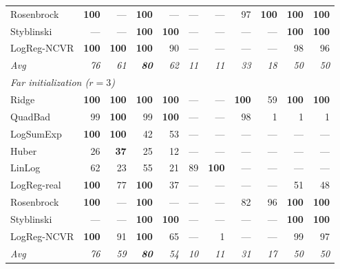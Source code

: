 \documentclass[11pt,a4paper]{article}
\begin{document}
\begin{table}[t]
\begin{tabular}{l rrrr rr rrrr}
			Rosenbrock  & \textbf{100} & --- & \textbf{100} & --- & --- & --- & 97  & \textbf{100} & \textbf{100} & \textbf{100} \\
			Styblinski  & --- & --- & \textbf{100} & \textbf{100} & --- & --- & --- & --- & \textbf{100} & \textbf{100} \\
			LogReg-NCVR & \textbf{100} & \textbf{100} & \textbf{100} & 90  & --- & --- & --- & --- & 98  & 96  \\
			\textit{Avg} & \textit{76} & \textit{61} & \textbf{\textit{80}} & \textit{62}
			& \textit{11} & \textit{11} & \textit{33} & \textit{18}
			& \textit{50} & \textit{50} \\
			\midrule
			\multicolumn{11}{l}{\textit{Far initialization ($r{=}3$)}} \\
			\midrule
			Ridge       & \textbf{100} & \textbf{100} & \textbf{100} & \textbf{100} & --- & --- & \textbf{100} & 59  & \textbf{100} & \textbf{100} \\
			QuadBad     & 99  & \textbf{100} & 99  & \textbf{100} & --- & --- & 98  & 1   & 1   & 1   \\
			LogSumExp   & \textbf{100} & \textbf{100} & 42  & 53  & --- & --- & --- & --- & --- & --- \\
			Huber       & 26  & \textbf{37}  & 25  & 12  & --- & --- & --- & --- & --- & --- \\
			LinLog      & 62  & 23  & 55  & 21  & 89  & \textbf{100} & --- & --- & --- & --- \\
			LogReg-real & \textbf{100} & 77  & \textbf{100} & 37  & --- & --- & --- & --- & 51  & 48  \\
			Rosenbrock  & \textbf{100} & --- & \textbf{100} & --- & --- & --- & 82  & 96  & \textbf{100} & \textbf{100} \\
			Styblinski  & --- & --- & \textbf{100} & \textbf{100} & --- & --- & --- & --- & \textbf{100} & \textbf{100} \\
			LogReg-NCVR & \textbf{100} & 91  & \textbf{100} & 65  & --- & 1   & --- & --- & 99  & 97  \\
			\textit{Avg} & \textit{76} & \textit{59} & \textbf{\textit{80}} & \textit{54}
			& \textit{10} & \textit{11} & \textit{31} & \textit{17}
			& \textit{50} & \textit{50} \\
			\bottomrule
		\end{tabular}
	\end{table}
	
\end{document}
